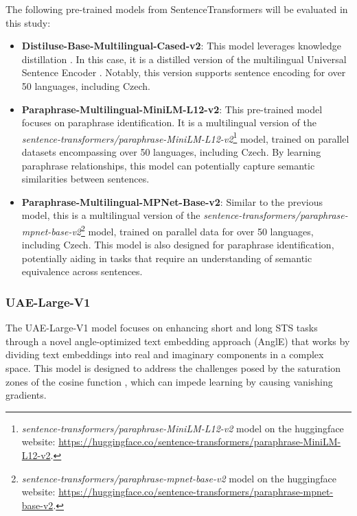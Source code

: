 The following pre-trained models from SentenceTransformers will be evaluated in this study:
\begin{itemize}
  \item \textbf{Distiluse-Base-Multilingual-Cased-v2}:
    This model leverages knowledge distillation \cite{sanh2020distilbert}.
    In this case, it is a distilled version of the multilingual Universal Sentence Encoder \cite{yang2019multilingual}.
    Notably, this version supports sentence encoding for over 50 languages, including Czech.
  \item \textbf{Paraphrase-Multilingual-MiniLM-L12-v2}: This pre-trained model focuses on paraphrase identification.
    It is a multilingual version of the \textit{sentence-transformers/paraphrase-MiniLM-L12-v2}\footnote{\textit{sentence-transformers/paraphrase-MiniLM-L12-v2} model on the huggingface website: \url{https://huggingface.co/sentence-transformers/paraphrase-MiniLM-L12-v2}.} model, trained on parallel datasets encompassing over 50 languages, including Czech.
    By learning paraphrase relationships, this model can potentially capture semantic similarities between sentences.
  \item \textbf{Paraphrase-Multilingual-MPNet-Base-v2}: Similar to the previous model, this is a multilingual version of the \textit{sentence-transformers/paraphrase-mpnet-base-v2}\footnote{\textit{sentence-transformers/paraphrase-mpnet-base-v2} model on the huggingface website: \url{https://huggingface.co/sentence-transformers/paraphrase-mpnet-base-v2}.} model, trained on parallel data for over 50 languages, including Czech.
    This model is also designed for paraphrase identification, potentially aiding in tasks that require an understanding of semantic equivalence across sentences.
\end{itemize}



\subsubsection{UAE-Large-V1} \label{model-uae-large-v1}
The UAE-Large-V1 model \cite{li2024angleoptimized} focuses on enhancing short and long \ac{STS} tasks through a novel angle-optimized text embedding approach (AnglE) \cite{li2024angleoptimized} that works by dividing text embeddings into real and imaginary components in a complex space.
This model is designed to address the challenges posed by the saturation zones of the cosine function , which can impede learning by causing vanishing gradients.

